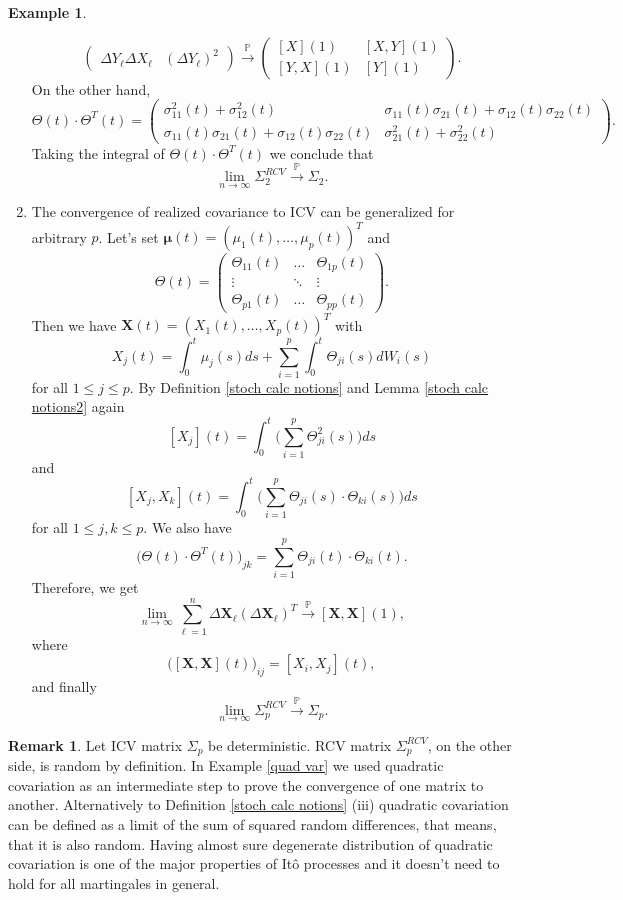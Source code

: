 \documentclass[a4paper,11pt]{book}
\theoremstyle{plain}
\theoremstyle{definition}
\newtheorem{exmp}[thm]{Example}
\newtheorem{rmrk}[thm]{Remark}
\begin{document}
\begin{exmp}
\begin{enumerate}
\[\begin{pmatrix}
			\Delta Y_\ell \Delta X_\ell & (\Delta Y_\ell)^2
			\end{pmatrix} 
			\xrightarrow{\mathbb{P}} 
			\begin{pmatrix}
			[X](1) & [X, Y](1) \\
			[Y, X](1) & [Y](1)
		    \end{pmatrix}.
			\]
			On the other hand,
			\[ \Theta(t) \cdot \Theta^T(t) = \begin{pmatrix}
			\sigma_{11}^2(t) + \sigma_{12}^2(t) & \sigma_{11}(t)\sigma_{21}(t) + \sigma_{12}(t)\sigma_{22}(t) \\
			\sigma_{11}(t)\sigma_{21}(t) + \sigma_{12}(t)\sigma_{22}(t)  & \sigma_{21}^2(t) + \sigma_{22}^2(t)
			\end{pmatrix}. \]
			Taking the integral of $\Theta(t) \cdot \Theta^T(t)$ we conclude that
			\[ \lim_{n \rightarrow \infty} \Sigma_2^{RCV} \xrightarrow{\mathbb{P}} \Sigma_2. \]
			\item 
			The convergence of realized covariance to ICV can be generalized for arbitrary $p$. Let's set $\boldsymbol{\mu}(t) = (\mu_1(t), \dots, \mu_p(t))^T$ and
			\[ 
			\Theta(t) = \begin{pmatrix}
			\Theta_{11}(t) & \dots & \Theta_{1p}(t) \\
			\vdots & \ddots & \vdots \\
			\Theta_{p1}(t) & \dots & \Theta_{pp}(t)
			\end{pmatrix}.
			\]
			Then we have $\mathbf{X}(t) = (X_1(t), \dots, X_p(t))^T$ with
			\[X_j(t) =  \int_0^t\mu_j(s) ds +  \sum_{i=1}^{p} \int_0^t \Theta_{ji}(s) dW_i(s) \]			
			for all $1 \leq j \leq p$. By Definition \ref{stoch calc notions} and Lemma \ref{stoch calc notions2} again
			\[ [X_j](t)= \int_0^t \bigg( \sum_{i=1}^{p} \Theta_{ji}^2(s) \bigg) ds \]
			and
			\[ [X_j, X_k](t) = \int_0^t \bigg(  \sum_{i=1}^{p} \Theta_{ji}(s) \cdot \Theta_{ki}(s) \bigg) ds \]
			for all $1 \leq j,k \leq p$.
			We also have
			\[ 
			\Big(\Theta(t) \cdot \Theta^T(t) \Big)_{jk}   = \sum_{i=1}^{p} \Theta_{ji}(t) \cdot \Theta_{ki}(t).
			\]
			Therefore, we get
			\[  \lim_{n \rightarrow \infty} \sum_{\ell=1}^{n}\Delta \mathbf{X}_\ell(\Delta \mathbf{X}_\ell)^T \xrightarrow{\mathbb{P}} [\mathbf{X}, \mathbf{X}](1), \]
			where 
			\[ \Big( [\mathbf{X}, \mathbf{X}](t)\Big)_{ij} = [X_i, X_j](t), \]
			and finally
			\[ \lim_{n \rightarrow \infty} \Sigma_p^{RCV} \xrightarrow{\mathbb{P}} \Sigma_p. \]
		\end{enumerate}
		
		\begin{rmrk}
			Let ICV matrix $\Sigma_p$ be deterministic. RCV matrix $\Sigma_p^{RCV}$, on the other side, is random by definition. In Example \ref{quad var} we used quadratic covariation as an intermediate step to prove the convergence of one matrix to another. Alternatively to Definition \ref{stoch calc notions} (iii) quadratic covariation can be defined as a limit of the sum of squared random differences, that means, that it is also random. Having almost sure degenerate distribution of quadratic covariation is one of the major properties of Itô processes and it doesn't need to hold for all martingales in general.
		\end{rmrk}
		

\end{exmp}
\end{document}
